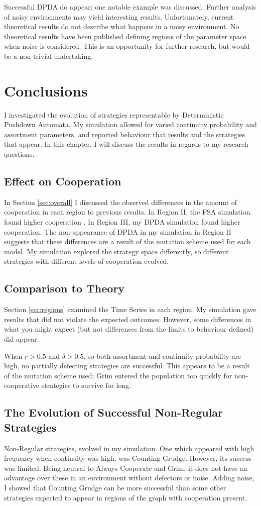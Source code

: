 \documentclass[a4paper,11pt,bcshonoursthesis,singlespace,oneside,thesisdraft,pdflatex]{cssethesis}
\begin{document}
Successful DPDA do appear; one notable example was discussed. 
Further analysis of noisy environments may yield interesting results. 
Unfortunately, current theoretical results do not describe what happens in a noisy environment. 
No theoretical results have been published defining regions of the parameter space when noise is considered. This is an opportunity for further research, but would be a non-trivial undertaking. 
\chapter{Conclusions}
\label{chap:conclusions}
I investigated the evolution of strategies representable by Deterministic Pushdown Automata. 
My simulation allowed for varied continuity probability and assortment parameters, and reported behaviour that results and the strategies that appear. In this chapter, I will discuss the results in regards to my research questions.
\section{Effect on Cooperation}
In Section \ref{sec:overall} I discussed the observed differences in the amount of cooperation in each region to previous results. 
In Region II, the FSA simulation found higher cooperation \citep{van-veelen:PNAS:2012}. 
In Region III, my DPDA simulation found higher cooperation. 
The non-appearance of DPDA in my simulation in Region II suggests that these differences are a result of the mutation scheme used for each model. 
My simulation explored the strategy space differently, so different strategies with different levels of cooperation evolved. 
\section{Comparison to Theory}
Section \ref{sec:regions} examined the Time Series in each region. 
My simulation gave results that did not violate the expected outcomes. 
However, some differences in what you might expect (but not differences from the limits to behaviour \citep{van-veelen:PNAS:2012} defined) did appear. 

When $r>0.5$ and $\delta>0.5$, so both assortment and continuity probability are high, no partially defecting strategies are successful. 
This appears to be a result of the mutation scheme used; Grim entered the population too quickly for non-cooperative strategies to survive for long.
\section{The Evolution of Successful Non-Regular Strategies}
\label{sec:dpda}
Non-Regular strategies, evolved in my simulation. One which appeared with high frequency when continuity was high, was Counting Grudge. 
However, its success was limited. 
Being neutral to Always Cooperate and Grim, it does not have an advantage over these in an environment without defectors or noise. 
Adding noise, I showed that Counting Grudge can be more successful than some other strategies expected to appear in regions of the graph with cooperation present. 
\end{document}
